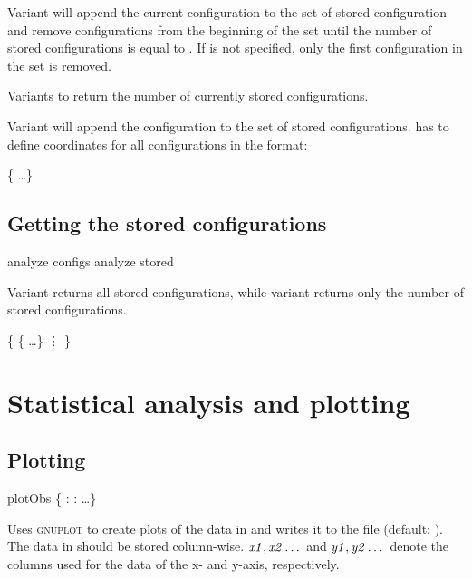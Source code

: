 \begin{essyntex}
Variant  will append the current configuration to the set
of stored configuration and remove configurations from the beginning
of the set until the number of stored configurations is equal to
. If  is not specified, only the first
configuration in the set is removed.

Variants  to  return the number of currently
stored configurations.

Variant  will append the configuration  to the
set of stored configurations.  has to define coordinates
for all configurations in the format:
\begin{code}
 \{      \dots \}
\end{code}

\subsection{Getting the stored configurations}
\label{analyze:configs}
\label{analyze:stored}
\begin{essyntax}
   analyze configs
   analyze stored 
\end{essyntax}

Variant  returns all stored configurations, while variant
 returns only the number of stored configurations.

\begin{code}
\{
  \{      \dots \}
  \vdots
\}
\end{code}

\section{Statistical analysis and plotting}



\subsection{Plotting}

\begin{essyntax}
  plotObs  \{ : : \dots \}
\end{essyntax}
Uses \textsc{gnuplot} to create plots of the data in  and
writes it to the file  (default:
). The data in  should be stored
column-wise. $\mbox{\textrm{\textit{x1}}}, \mbox{\textrm{\textit{x2}}} \dots$ and $\mbox{\textrm{\textit{y1}}}, \mbox{\textrm{\textit{y2}}} \dots$
denote the columns used for the data of the x- and y-axis,
respectively.


\end{essyntex}

